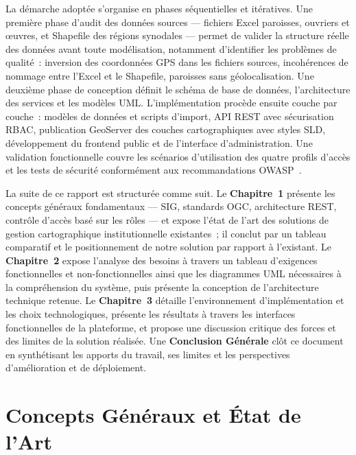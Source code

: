 \documentclass[12pt, a4paper]{report}
\begin{document}
La démarche adoptée s'organise en phases séquentielles et itératives. Une première
phase d'audit des données sources --- fichiers Excel paroisses, ouvriers et
œuvres, et Shapefile des régions synodales --- permet de valider la structure
réelle des données avant toute modélisation, notamment d'identifier les problèmes
de qualité~: inversion des coordonnées GPS dans les fichiers sources, incohérences
de nommage entre l'Excel et le Shapefile, paroisses sans géolocalisation. Une
deuxième phase de conception définit le schéma de base de données, l'architecture
des services et les modèles UML. L'implémentation procède ensuite couche par
couche~: modèles de données et scripts d'import, API REST avec sécurisation RBAC,
publication GeoServer des couches cartographiques avec styles SLD, développement
du frontend public et de l'interface d'administration. Une validation fonctionnelle
couvre les scénarios d'utilisation des quatre profils d'accès et les tests de
sécurité conformément aux recommandations OWASP~\cite{owasp2021}.

\medskip

La suite de ce rapport est structurée comme suit. Le \textbf{Chapitre~1} présente
les concepts généraux fondamentaux --- SIG, standards OGC, architecture REST,
contrôle d'accès basé sur les rôles --- et expose l'état de l'art des solutions
de gestion cartographique institutionnelle existantes~; il conclut par un tableau
comparatif et le positionnement de notre solution par rapport à l'existant. Le
\textbf{Chapitre~2} expose l'analyse des besoins à travers un tableau d'exigences
fonctionnelles et non-fonctionnelles ainsi que les diagrammes UML nécessaires à la
compréhension du système, puis présente la conception de l'architecture technique
retenue. Le \textbf{Chapitre~3} détaille l'environnement d'implémentation et les
choix technologiques, présente les résultats à travers les interfaces fonctionnelles
de la plateforme, et propose une discussion critique des forces et des limites de la
solution réalisée. Une \textbf{Conclusion Générale} clôt ce document en synthétisant
les apports du travail, ses limites et les perspectives d'amélioration et de
déploiement.

\clearpage

\chapter{Concepts Généraux et État de l'Art}
\end{document}
